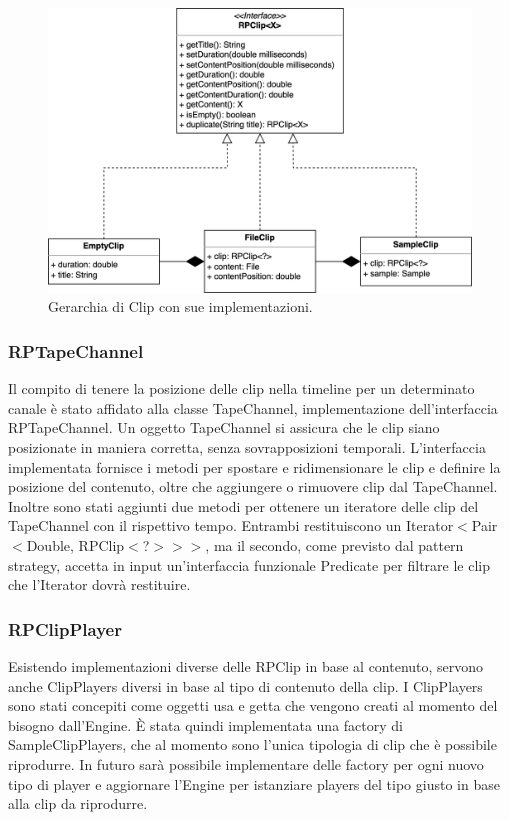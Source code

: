 \documentclass[a4paper,12pt]{report}
\begin{document}
\begin{figure}[H]
\centering{}
\includegraphics[width=\textwidth]{img/clip.png}
\caption{Gerarchia di Clip con sue implementazioni.}
\end{figure}

\subsubsection{RPTapeChannel}
Il compito di tenere la posizione delle clip nella timeline per un determinato canale è stato affidato alla classe TapeChannel, implementazione dell’interfaccia RPTapeChannel. Un oggetto TapeChannel si assicura che le clip siano posizionate in maniera corretta, senza sovrapposizioni temporali.
L’interfaccia implementata fornisce i metodi per spostare e ridimensionare le clip e definire la posizione del contenuto, oltre che aggiungere o rimuovere clip dal TapeChannel.
Inoltre sono stati aggiunti due metodi per ottenere un iteratore delle clip del TapeChannel con il rispettivo tempo. Entrambi restituiscono un Iterator\begin{math}<\end{math}Pair\begin{math}<\end{math}Double, RPClip\begin{math}<\end{math}?\begin{math}>>>\end{math}, ma il secondo, come previsto dal pattern strategy, accetta in input un'interfaccia funzionale Predicate per filtrare le clip che l’Iterator dovrà restituire.
\endsubsubsection
\subsubsection{RPClipPlayer}
Esistendo implementazioni diverse delle RPClip in base al contenuto, servono anche ClipPlayers diversi in base al tipo di contenuto della clip.
I ClipPlayers sono stati concepiti come oggetti usa e getta che vengono creati al momento del bisogno dall’Engine. È stata quindi implementata una factory di SampleClipPlayers, che al momento sono l’unica tipologia di clip che è possibile riprodurre. In futuro sarà possibile implementare delle factory per ogni nuovo tipo di player e aggiornare l’Engine per istanziare players del tipo giusto in base alla clip da riprodurre.
\end{document}
